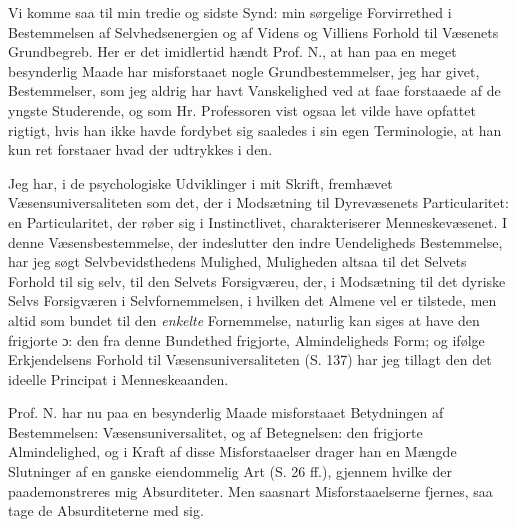 \documentclass[12pt,a4paper]{book}
\newcommand{\opage}[1]{\marginnote{\footnotesize\textit{[#1]}}}
\begin{document}
Vi komme saa til min tredie og sidste Synd: min sørgelige Forvirrethed i
Bestemmelsen af Selvhedsenergien og af Videns og Villiens Forhold til Væsenets
Grundbegreb. Her er det imidlertid hændt Prof. N., at han paa en meget
besynderlig Maade har misforstaaet nogle Grundbestemmelser, jeg har givet,
Bestemmelser, som jeg aldrig har havt Vanskelighed ved at faae forstaaede af de
yngste Studerende, og som Hr. Professoren vist ogsaa let vilde have opfattet
rigtigt, hvis han ikke havde fordybet sig saaledes i sin egen Terminologie, at
han kun ret forstaaer hvad der udtrykkes i den.

Jeg har, i de psychologiske Udviklinger i mit Skrift, fremhævet
Væsensuniversaliteten som det, der i Modsætning
\opage{13} til Dyrevæsenets Particularitet: en Particularitet, der røber sig i Instinctlivet,
charakteriserer Menneskevæsenet. I denne Væsensbestemmelse, der indeslutter den
indre Uendeligheds Bestemmelse, har jeg søgt Selvbevidsthedens Mulighed,
Muligheden altsaa til det Selvets Forhold til sig selv, til den Selvets
Forsigværeu, der, i Modsætning til det dyriske Selvs Forsigværen i
Selvfornemmelsen, i hvilken det Almene vel er tilstede, men altid som bundet til
den \emph{enkelte} Fornemmelse, naturlig kan siges at have den frigjorte ɔ: den
fra denne Bundethed frigjorte, Almindeligheds Form; og ifølge Erkjendelsens
Forhold til Væsensuniversaliteten (S. 137) har jeg tillagt den det ideelle
Principat i Menneskeaanden.

Prof. N. har nu paa en besynderlig Maade misforstaaet Betydningen af
Bestemmelsen: Væsensuniversalitet, og af Betegnelsen: den frigjorte
Almindelighed, og i Kraft af disse Misforstaaelser drager han en Mængde
Slutninger af en ganske eiendommelig Art (S. 26 ff.), gjennem hvilke der
paademonstreres mig Absurditeter. Men saasnart Misforstaaelserne fjernes, saa
tage de Absurditeterne med sig.
\end{document}
